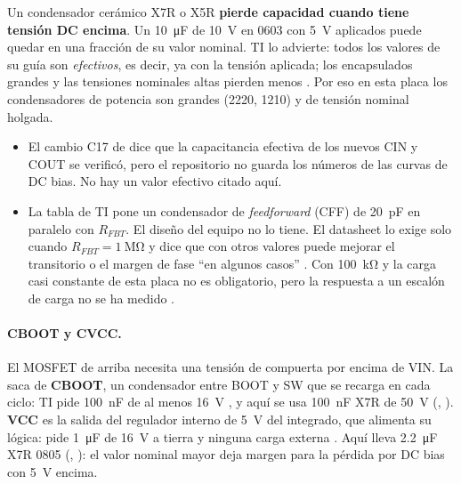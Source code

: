 \begin{idea}
Un condensador cerámico X7R o X5R \textbf{pierde capacidad cuando tiene tensión DC encima}. Un \SI{10}{\micro\farad} de \SI{10}{\volt} en 0603 con \SI{5}{\volt} aplicados puede quedar en una fracción de su valor nominal. TI lo advierte: todos los valores de su guía son \emph{efectivos}, es decir, ya con la tensión aplicada; los encapsulados grandes y las tensiones nominales altas pierden menos . Por eso en esta placa los condensadores de potencia son grandes (2220, 1210) y de tensión nominal holgada.
\end{idea}

\begin{ojo}
\begin{itemize}
  \item El cambio C17 de  dice que la capacitancia efectiva de los nuevos CIN y COUT se verificó, pero el repositorio no guarda los números de las curvas de DC bias. No hay un valor efectivo citado aquí.
  \item La tabla de TI pone un condensador de \emph{feedforward} (CFF) de \SI{20}{\pico\farad} en paralelo con $R_{FBT}$. El diseño del equipo no lo tiene. El datasheet lo exige solo cuando $R_{FBT}=\SI{1}{\mega\ohm}$  y dice que con otros valores puede mejorar el transitorio o el margen de fase ``en algunos casos'' . Con \SI{100}{\kilo\ohm} y la carga casi constante de esta placa no es obligatorio, pero la respuesta a un escalón de carga no se ha medido \medir.
\end{itemize}
\end{ojo}

\paragraph{CBOOT y CVCC.} El MOSFET de arriba necesita una tensión de compuerta por encima de VIN. La saca de \textbf{CBOOT}, un condensador entre BOOT y SW que se recarga en cada ciclo: TI pide \SI{100}{\nano\farad} de al menos \SI{16}{\volt} , y aquí se usa \SI{100}{\nano\farad} X7R de \SI{50}{\volt} (, ). \textbf{VCC} es la salida del regulador interno de \SI{5}{\volt} del integrado, que alimenta su lógica: pide \SI{1}{\micro\farad} de \SI{16}{\volt} a tierra y ninguna carga externa . Aquí lleva \SI{2.2}{\micro\farad} X7R 0805 (, ): el valor nominal mayor deja margen para la pérdida por DC bias con \SI{5}{\volt} encima.

